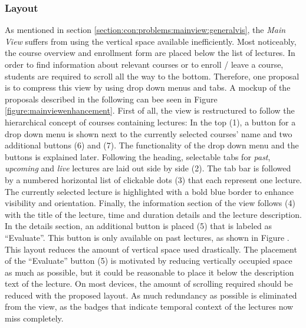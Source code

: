 \subsubsection{Layout}
As mentioned in section \ref{section:con:problems:mainview:generalvis}, the \emph{Main View} suffers from using the vertical space available inefficiently. Most noticeably, the course overview and enrollment form are placed below the list of lectures. In order to find information about relevant courses or to enroll / leave a course, students are required to scroll all the way to the bottom. 
Therefore, one proposal is to compress this view by using drop down menus and tabs. A mockup of the proposals described in the following can bee seen in Figure \ref{figure:mainviewenhancement}. First of all, the view is restructured to follow the hierarchical concept of courses containing lectures: In the top (1), a button for a drop down menu is shown next to the currently selected courses' name and two additional buttons (6) and (7). The functionality of the drop down menu and the buttons is explained later.
Following the heading, selectable tabs for \emph{past}, \emph{upcoming} and \emph{live} lectures are laid out side by side (2). The tab bar is followed by a numbered horizontal list of clickable dots (3) that each represent one lecture. The currently selected lecture is highlighted with a bold blue border to enhance visibility and orientation. Finally, the information section of the view follows (4) with the title of the lecture, time and duration details and the lecture description. In the details section, an additional button is placed (5) that is labeled as “Evaluate”. This button is only available on past lectures, as shown in Figure \todosct.
\todogrf
This layout reduces the amount of vertical space used drastically. The placement of the “Evaluate” button (5) is motivated by reducing vertically occupied space as much as possible, but it could be reasonable to place it below the description text of the lecture. On most devices, the amount of scrolling required should be reduced with the proposed layout. As much redundancy as possible is eliminated from the view, as the badges that indicate temporal context of the lectures now miss completely.
